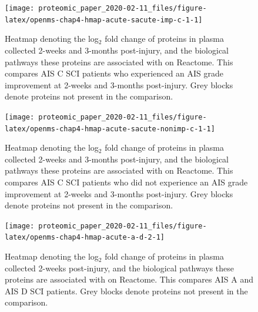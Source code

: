 \documentclass[9pt,lineno]{elife}
\newcommand{\blandscape}{\begin{landscape}}
\newcommand{\elandscape}{\end{landscape}}
\begin{document}
\begin{landscape}
\begin{landscape}
\begin{landscape}
\begin{figure}

{\centering \texttt{[image: proteomic\_paper\_2020-02-11\_files/figure-latex/openms-chap4-hmap-acute-sacute-imp-c-1-1]} 

}

\caption[Heatmap - label-free - Acute C Improvers VS Subacute Improvers]{Heatmap denoting the log\(_2\) fold change of proteins in plasma collected 2-weeks and 3-months post-injury, and the biological pathways these proteins are associated with on Reactome. This compares AIS C SCI patients who experienced an AIS grade improvement at 2-weeks and 3-months post-injury. Grey blocks denote proteins not present in the comparison.}\label{fig:openms-chap4-hmap-acute-sacute-imp-c-1}
\end{figure}

\elandscape
\blandscape



\begin{figure}

{\centering \texttt{[image: proteomic\_paper\_2020-02-11\_files/figure-latex/openms-chap4-hmap-acute-sacute-nonimp-c-1-1]} 

}

\caption[Heatmap - label-free - Acute C Non-Improvers VS Subacute Non-Improvers]{Heatmap denoting the log\(_2\) fold change of proteins in plasma collected 2-weeks and 3-months post-injury, and the biological pathways these proteins are associated with on Reactome. This compares AIS C SCI patients who did not experience an AIS grade improvement at 2-weeks and 3-months post-injury. Grey blocks denote proteins not present in the comparison.}\label{fig:openms-chap4-hmap-acute-sacute-nonimp-c-1}
\end{figure}

\elandscape
\blandscape



\begin{figure}

{\centering \texttt{[image: proteomic\_paper\_2020-02-11\_files/figure-latex/openms-chap4-hmap-acute-a-d-2-1]} 

}

\caption[Heatmap - label-free - Acute A VS Acute D]{Heatmap denoting the log\(_2\) fold change of proteins in plasma collected 2-weeks post-injury, and the biological pathways these proteins are associated with on Reactome. This compares AIS A and AIS D SCI patients. Grey blocks denote proteins not present in the comparison.}\label{fig:openms-chap4-hmap-acute-a-d-2}
\end{figure}


\end{landscape}
\end{landscape}
\end{landscape}
\end{document}
